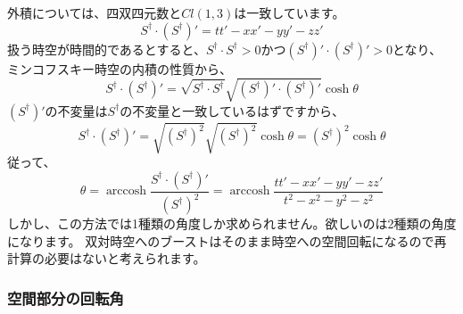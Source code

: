 \documentclass[a4paper,12pt,notitlepage]{jsreport}
\DeclareMathOperator\arccosh{arccosh}
\begin{document}
外積については、四双四元数と$ Cl(1,3) $は一致しています。
\begin{equation}
  S^\dag \cdot (S^\dag)' = t t' - x x' - y y' - z z'
\end{equation}
扱う時空が時間的であるとすると、$ S^\dag \cdot S^\dag > 0 $かつ$ (S^\dag)' \cdot (S^\dag)' > 0 $となり、
ミンコフスキー時空の内積の性質から、
\begin{equation}
  S^\dag \cdot (S^\dag)' = \sqrt{S^\dag \cdot S^\dag} \sqrt{(S^\dag)' \cdot (S^\dag)'} \cosh \theta
\end{equation}
$ (S^\dag)' $の不変量は$ S^\dag $の不変量と一致しているはずですから、
\begin{equation}
  S^\dag \cdot (S^\dag)' = \sqrt{(S^\dag)^2} \sqrt{(S^\dag)^2} \cosh \theta = (S^\dag)^2 \cosh \theta
\end{equation}
従って、
\begin{equation}
  \theta = \arccosh \frac{S^\dag \cdot (S^\dag)'}{(S^\dag)^2}
  = \arccosh \frac{t t' - x x' - y y' - z z'}{t^2 - x^2 - y^2 - z^2}
\end{equation}
しかし、この方法では1種類の角度しか求められません。欲しいのは2種類の角度になります。
双対時空へのブーストはそのまま時空への空間回転になるので再計算の必要はないと考えられます。

\subsubsection{空間部分の回転角}
\end{document}
